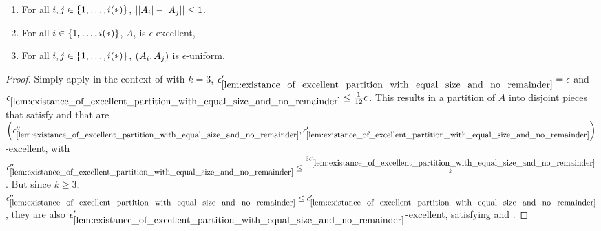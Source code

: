 \begin{lemma}[Corollary 5.15]
\begin{enumerate}[label=(\roman*), ref=\roman*]
            \item \label{itm:resume_of_all_conditions_for_excellent_partitions.i} For all $i, j \in \left\{ 1, \dots, i(*) \right\}$, $\left| \left| A_i \right|- \left| A_j \right| \right| \leq 1$.
            \item \label{itm:resume_of_all_conditions_for_excellent_partitions.ii} For all $i \in \left\{ 1, \dots, i(*) \right\}$, $A_i$ is $\epsilon$-excellent,
            \item \label{itm:resume_of_all_conditions_for_excellent_partitions.iii} For all $i, j \in \left\{ 1, \dots, i(*) \right\}$, $\left( A_i, A_j \right)$ is $\epsilon$-uniform.
        \end{enumerate}
        \begin{proof}
            Simply apply  in the context of
             with $k = 3$,
            ${\epsilon'_{\ref{lem:existance_of_excellent_partition_with_equal_size_and_no_remainder}}} = \epsilon$
            and ${\epsilon_{\ref{lem:existance_of_excellent_partition_with_equal_size_and_no_remainder}}} \leq \frac{1}{12} \epsilon$.
            This results in a partition of $A$ into disjoint pieces that satisfy
             and that are
            $\left( {\epsilon''_{\ref{lem:existance_of_excellent_partition_with_equal_size_and_no_remainder}}},
                \epsilon'_{\ref{lem:existance_of_excellent_partition_with_equal_size_and_no_remainder}} \right)$-excellent,
            with ${\epsilon''_{\ref{lem:existance_of_excellent_partition_with_equal_size_and_no_remainder}}} \leq
                \frac{3 \epsilon'_{\ref{lem:existance_of_excellent_partition_with_equal_size_and_no_remainder}}}{k}$.
            But since $k \geq 3$, ${\epsilon''_{\ref{lem:existance_of_excellent_partition_with_equal_size_and_no_remainder}}} \leq
                \epsilon'_{\ref{lem:existance_of_excellent_partition_with_equal_size_and_no_remainder}}$, they are also
            $\epsilon'_{\ref{lem:existance_of_excellent_partition_with_equal_size_and_no_remainder}}$-excellent, satisfying
             and
            .
        \end{proof}
    \end{lemma}

